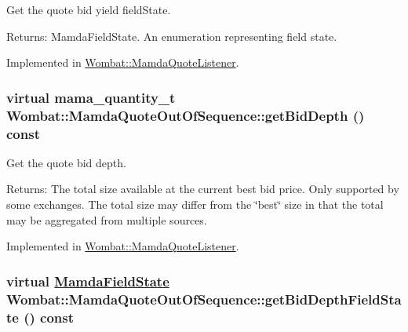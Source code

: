 Get the quote bid yield field\-State. 

\begin{Desc}
\item[Returns:]Mamda\-Field\-State. An enumeration representing field state. \end{Desc}


Implemented in \hyperlink{classWombat_1_1MamdaQuoteListener_00ecbc2964d5439e77d04ffc2d00d9e9}{Wombat::Mamda\-Quote\-Listener}.\hypertarget{classWombat_1_1MamdaQuoteOutOfSequence_3f27ce9e3648fbacc6cfdd4cb19c4f2c}{
\subsubsection[getBidDepth]{\setlength{\rightskip}{0pt plus 5cm}virtual mama\_\-quantity\_\-t Wombat::Mamda\-Quote\-Out\-Of\-Sequence::get\-Bid\-Depth () const}}
\label{classWombat_1_1MamdaQuoteOutOfSequence_3f27ce9e3648fbacc6cfdd4cb19c4f2c}


Get the quote bid depth. 

\begin{Desc}
\item[Returns:]The total size available at the current best bid price. Only supported by some exchanges. The total size may differ from the \char`\"{}best\char`\"{} size in that the total may be aggregated from multiple sources. \end{Desc}


Implemented in \hyperlink{classWombat_1_1MamdaQuoteListener_3f4909f6e25bef5324df4c4fa89bda74}{Wombat::Mamda\-Quote\-Listener}.\hypertarget{classWombat_1_1MamdaQuoteOutOfSequence_9755be1e5c5d476b19ec99e71d1bd3ea}{
\subsubsection[getBidDepthFieldState]{\setlength{\rightskip}{0pt plus 5cm}virtual \hyperlink{namespaceWombat_93aac974f2ab713554fd12a1fa3b7d2a}{Mamda\-Field\-State} Wombat::Mamda\-Quote\-Out\-Of\-Sequence::get\-Bid\-Depth\-Field\-State () const}}
\label{classWombat_1_1MamdaQuoteOutOfSequence_9755be1e5c5d476b19ec99e71d1bd3ea}


